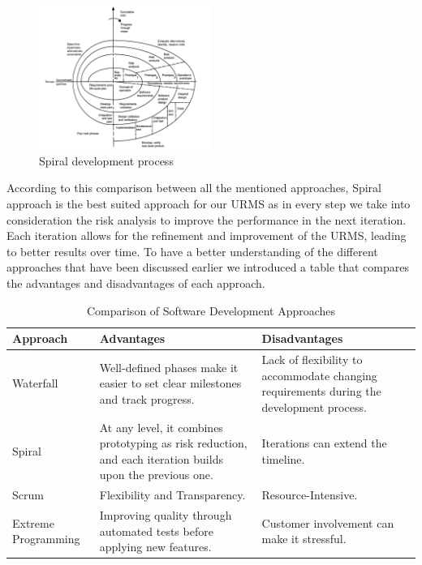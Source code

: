 \documentclass[conference,onecolumn]{IEEEtran}
\begin{document}
	\begin{figure}[H]
		\centering
		\includegraphics[width=0.5\textwidth]{Figures/Spiral.png}
		\caption{Spiral development process}
		\label{fig:spiral}
	\end{figure}

	According to this comparison between all the mentioned approaches, Spiral approach is the best suited approach for our URMS as in every step we take into consideration the risk analysis to improve the performance in the next iteration. Each iteration allows for the refinement and improvement of the URMS, leading to better results over time. To have a better understanding of the different approaches that have been discussed earlier we introduced a table that compares the advantages and disadvantages of each approach.

	\begin{table}[h]
		\centering
		\begin{tabular}{|m{2.5cm}|m{5cm}|m{5cm}|}
			\hline
			\textbf{Approach} & \textbf{Advantages} & \textbf{Disadvantages} \\
			\hline
			Waterfall & Well-defined phases make it easier to set clear milestones and track progress. & Lack of flexibility to accommodate changing requirements during the development process. \\
			\hline
			Spiral & At any level, it combines prototyping as risk reduction, and each iteration builds upon the previous one. & Iterations can extend the timeline. \\
			\hline
			Scrum & Flexibility and Transparency. & Resource-Intensive. \\
			\hline
			Extreme Programming & Improving quality through automated tests before applying new features. & Customer involvement can make it stressful. \\
			\hline
		\end{tabular}
		\caption{Comparison of Software Development Approaches}
		\label{tab:sdapproaches}
	\end{table}
\end{document}
